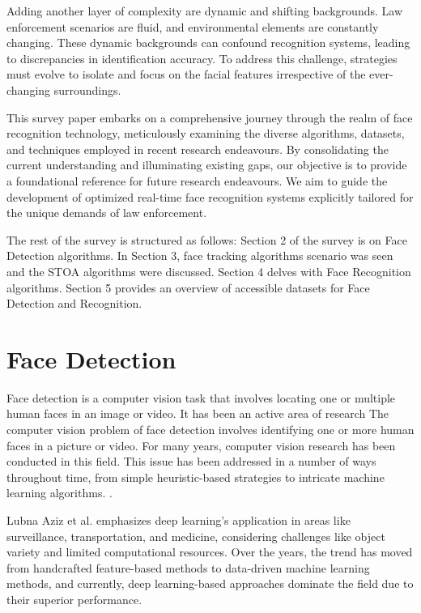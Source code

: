 Adding another layer of complexity are dynamic and shifting backgrounds. Law enforcement scenarios are fluid, and environmental elements are constantly changing. These dynamic backgrounds can confound recognition systems, leading to discrepancies in identification accuracy. To address this challenge, strategies must evolve to isolate and focus on the facial features irrespective of the ever-changing surroundings.

This survey paper embarks on a comprehensive journey through the realm of face recognition technology, meticulously examining the diverse algorithms, datasets, and techniques employed in recent research endeavours. By consolidating the current understanding and illuminating existing gaps, our objective is to provide a foundational reference for future research endeavours. We aim to guide the development of optimized real-time face recognition systems explicitly tailored for the unique demands of law enforcement. 

The rest of the survey is structured as follows: Section 2 of the survey is on Face Detection algorithms. In Section 3, face tracking algorithms scenario was seen and the STOA algorithms were discussed. Section 4 delves with Face Recognition algorithms. Section 5 provides an overview of accessible datasets for Face Detection and Recognition.

\section{Face Detection} \label{section:fd}
Face detection is a computer vision task that involves locating one or multiple human faces in an image or video. It has been an active area of research The computer vision problem of face detection involves identifying one or more human faces in a picture or video. For many years, computer vision research has been conducted in this field. This issue has been addressed in a number of ways throughout time, from simple heuristic-based strategies to intricate machine learning algorithms. \cite{feng_detect_2022}.

Lubna Aziz et al. \cite{aziz_exploring_2020} emphasizes deep learning's application in areas like surveillance, transportation, and medicine, considering challenges like object variety and limited computational resources. Over the years, the trend has moved from handcrafted feature-based methods to data-driven machine learning methods, and currently, deep learning-based approaches dominate the field due to their superior performance.

